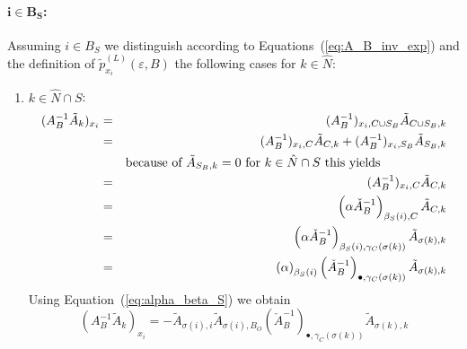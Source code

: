 \documentclass[a4paper]{article}
\begin{document}
\paragraph{$\mathbf{i \in B_{S}}$:}
Assuming $i \in B_{S}$ we distinguish
according to Equations~(\ref{eq:A_B_inv_exp})
and the definition of $\tilde{p}_{x_{i}}^{(L)}(\varepsilon, B)$
the following cases for $k \in \hat{N}$:
\begin{enumerate}
\item $k \in \hat{N} \cap S$:
\begin{eqnarray}
  (A_{B}^{-1}\tilde{A}_{k})_{x_{i}} &=& 
  (A_{B}^{-1})_{x_{i}, C \cup S_{B}}\tilde{A}_{C \cup S_{B}, k}
  \nonumber \\
  &=& 
  (A_{B}^{-1})_{x_{i}, C}\tilde{A}_{C, k} +
  (A_{B}^{-1})_{x_{i}, S_{B}}\tilde{A}_{S_{B}, k}
  \nonumber \\
  &&\begin{minipage}{9cm}
  because of $\tilde{A}_{S_{B}, k}=0$ for $k \in \hat{N} \cap S$ this yields
  \end{minipage}
  \nonumber \\
  &=&
  (A_{B}^{-1})_{x_{i}, C}\tilde{A}_{C, k}
  \nonumber \\ 
  &=&
  \left(\alpha\check{A}_{B}^{-1}\right)_{\beta_{S}(i), C}\tilde{A}_{C, k}
  \nonumber \\
  &=&
  \left(\alpha\check{A}_{B}^{-1}\right)_{\beta_{S}(i), \gamma_{C}(\sigma(k))}
  \tilde{A}_{\sigma(k), k}
  \nonumber \\
  &=&
  \left(\alpha\right)_{\beta_{S}(i)}
  \left(\check{A}_{B}^{-1}\right)_{\bullet, \gamma_{C}(\sigma(k))}
  \tilde{A}_{\sigma(k), k}
  \nonumber
\end{eqnarray}
Using Equation~(\ref{eq:alpha_beta_S}) we obtain
\begin{equation}
(A_{B}^{-1}\tilde{A}_{k})_{x_{i}} =
  -\tilde{A}_{\sigma(i), i}\tilde{A}_{\sigma(i), B_{O}}
  \left(\check{A}_{B}^{-1}\right)_{\bullet, \gamma_{C}(\sigma(k))}
  \tilde{A}_{\sigma(k), k}
\end{equation}


\end{enumerate}
\end{document}
